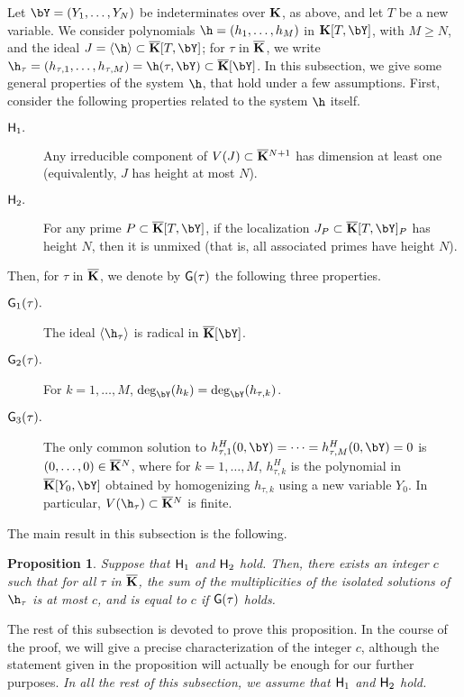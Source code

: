 \documentclass[12pt]{article}
\newtheorem{proposition}[definition]{Proposition}
\begin{document}
Let $\bY=(Y_1,\dots,Y_N)$ be indeterminates over $\mathbf{K}$, as above, and
let $T$ be a new variable. We consider polynomials
$\h=(h_1,\dots,h_M)$ in $\KK[T,\bY]$, with $M \ge N$, and the ideal $J=\langle \h
\rangle \subset \KKbar[T,\bY]$; for $\tau$ in $\overline{\mathbf{K}}$, we write
$\h_\tau=(h_{\tau,1},\dots,h_{\tau,M})=\h(\tau,\bY)\subset
\KKbar[\bY]$. In this subsection, we give some general properties of
the system $\h$, that hold under a few assumptions.  First, consider
the following properties related to the system $\h$ itself.
\begin{description}
\item[${\sf H}_1.$] Any irreducible component of $V(J) \subset
  \overline{\mathbf{K}}{}^{N+1}$ has dimension at least one (equivalently, $J$ has
  height at most $N$).
\item[${\sf H}_2.$] For any prime $P \subset\KKbar[T,\bY]$, if the
  localization $J_P \subset \KKbar[T,\bY]_P$ has height $N$, then it is
  unmixed (that is, all associated primes have height $N$).
\end{description}
Then, for $\tau$ in $\overline{\mathbf{K}}$, we denote by ${\sf G}(\tau)$ the
following three properties.
\begin{description}
\item[${\sf G}_1(\tau).$] The ideal $\langle \h_\tau \rangle$ is
  radical in $\KKbar[\bY]$.
\item[${\sf G}_2(\tau).$] For $k=1,\dots,M$,
  $\deg_\bY(h_k)=\deg_\bY(h_{\tau,k})$.
\item[${\sf G}_3(\tau).$] The only common solution to
  $h_{\tau,1}^H(0,\bY)=\cdots=h_{\tau,M}^H(0,\bY)=0$ is
  $(0,\dots,0)\in\overline{\mathbf{K}}{}^N$, where for $k=1,\dots,M$, $h_{\tau,k}^H$ is
  the polynomial in $\KKbar[Y_0,\bY]$ obtained by homogenizing
  $h_{\tau,k}$ using a new variable $Y_0$. In particular, $V(\h_\tau)
  \subset \KKbar{}^N$ is finite.
\end{description}

The main result in this subsection is the following.
\begin{proposition}\label{prop:degree_fiber}
  Suppose that ${\sf H}_1$ and ${\sf H}_2$ hold. Then, there exists an
  integer $c$ such that for all $\tau$ in $\overline{\mathbf{K}}$, the sum of the
  multiplicities of the isolated solutions of $\h_\tau$ is at most
  $c$, and is equal to $c$ if ${\sf G}(\tau)$ holds.
\end{proposition}

The rest of this subsection is devoted to prove this proposition. In
the course of the proof, we will give a precise characterization
of the integer $c$, although the statement given in the proposition
will actually be enough for our further purposes. {\em In all the rest
  of this subsection, we assume that ${\sf H}_1$ and ${\sf H}_2$
  hold.}
\end{document}
